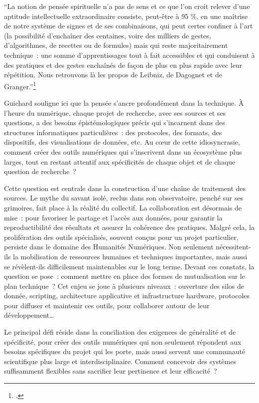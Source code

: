 \begin{kwote}
``La notion de pensée spirituelle n’a pas de sens et ce que l’on croit relever d’une aptitude intellectuelle extraordinaire consiste, peut-être à 95 \%, en une maîtrise de notre système de signes et de ses combinaisons, qui peut certes confiner à l’art (la possibilité d’enchaîner des centaines, voire des milliers de gestes, d’algorithmes, de recettes ou de formules) mais qui reste majoritairement technique~: une somme d’apprentissages tout à fait accessibles et qui conduisent à des pratiques et des gestes enchaînés de façon de plus en plus rapide avec leur répétition. Nous retrouvons là les propos de Leibniz, de Dagognet et de Granger.''\footcite{guichard_linternet_2014}
\end{kwote}

Guichard souligne ici que la pensée s'ancre profondément dans la technique. À l'heure du numérique, chaque projet de recherche, avec ses sources et ses questions, a des besoins épistémologiques précis qui s’incarnent dans des structures informatiques particulières~: des protocoles, des formats, des dispositifs, des visualisations de données, etc. Au cœur de cette idiosyncrasie, comment créer des outils numériques qui s'inscrivent dans un écosystème plus larges, tout en restant attentif aux spécificités de chaque objet et de chaque question de recherche~?

Cette question est centrale dans la construction d'une chaîne de traitement des sources. Le mythe du savant isolé, reclus dans son observatoire, penché sur ses grimoires, fait place à la réalité du collectif. La collaboration est désormais de mise~: pour favoriser le partage et l'accès aux données, pour garantir la reproductibilité des résultats et assurer la cohérence des pratiques. Malgré cela, la prolifération des outils spécialisés, souvent conçus pour un projet particulier, persiste dans le domaine des Humanités Numériques. Non seulement nécessitent-ils la mobilisation de ressources humaines et techniques importantes, mais aussi se révèlent-ils difficilement maintenables sur le long terme. Devant ces constats, la question se pose~: comment mettre en place des formes de mutualisation sur le plan technique~? Cet enjeu se joue à plusieurs niveaux~: ouverture des silos de donnée, scripting, architecture applicative et infrastructure hardware, protocoles pour diffuser et maintenir ces outils, pour collaborer autour de leur développement\ldots

Le principal défi réside dans la conciliation des exigences de généralité et de spécificité, pour créer des outils numériques qui non seulement répondent aux besoins spécifiques du projet qui les porte, mais aussi servent une communauté scientifique plus large et interdisciplinaire. Comment concevoir des systèmes suffisamment flexibles sans sacrifier leur pertinence et leur efficacité~? 

